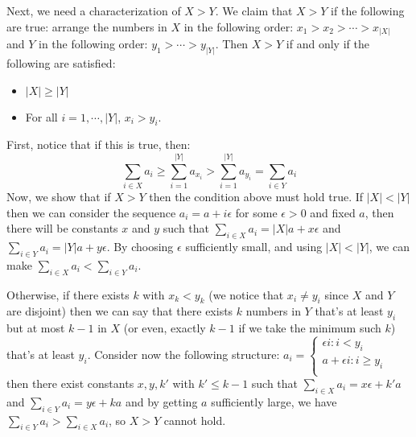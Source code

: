 \documentclass[11pt,a4paper]{article}
\begin{document}
\begin{enumerate}
	Next, we need a characterization of $X>Y$. We claim that $X>Y$ if the following are true: arrange the numbers in $X$ in the following order: $x_1>x_2>\cdots > x_{|X|}$ and $Y$ in the following order: $y_1>\cdots > y_{|Y|}$. Then $X>Y$ if and only if the following are satisfied: 
	\begin{itemize}
		\item $|X|\ge |Y|$
		\item For all $i=1, \cdots , |Y|$, $x_i>y_i$. 
	\end{itemize}
	First, notice that if this is true, then: 
	\[
	\sum_{i \in X} a_{i} \ge \sum_{i=1}^{|Y|} a_{x_i}> \sum_{i=1}^{|Y|} a_{y_i} = \sum_{i \in Y} a_{i}
	\]
	Now, we show that if $X>Y$ then the condition above must hold true. If $|X|<|Y|$ then we can consider the sequence $a_i=a+i\epsilon$ for some $\epsilon>0$ and fixed $a$, then there will be constants $x$ and $y$ such that $\sum_{i \in X} a_{i}=|X|a+x\epsilon$ and $\sum_{i \in Y} a_{i} = |Y|a+y\epsilon$. By choosing $\epsilon$ sufficiently small, and using $|X|<|Y|$, we can make $\sum_{i \in X} a_{i}<\sum_{i \in Y} a_{i}$. 
	
	Otherwise, if there exists $k$ with $x_k<y_k$ (we notice that $x_i\neq y_i$ since $X$ and $Y$ are disjoint) then we can say that there exists $k$ numbers in $Y$ that's at least $y_i$ but at most $k-1$ in $X$ (or even, exactly $k-1$ if we take the minimum such $k$) that's at least $y_i$. Consider now the following structure: $a_i=\begin{cases}
	 \epsilon i: i < y_i\\
	 a+\epsilon i: i \ge y_i\\
	\end{cases}
	$
	then there exist constants $x, y, k'$ with $k'\le k-1$ such that $\sum_{i \in X} a_{i} = x\epsilon + k'a$ and $\sum_{i \in Y} a_{i} = y\epsilon + ka$ and by getting $a$ sufficiently large, we have $\sum_{i \in Y} a_{i}>\sum_{i \in X} a_{i}$, so $X>Y$ cannot hold. 
	

\end{enumerate}
\end{document}
